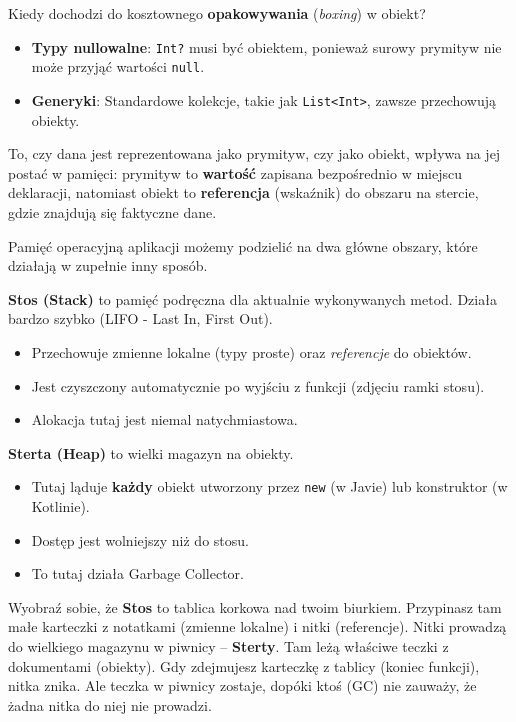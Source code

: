 Kiedy dochodzi do kosztownego \textbf{opakowywania} (\textit{boxing}) w obiekt?
\begin{itemize}
    \item \textbf{Typy nullowalne}: \texttt{Int?} musi być obiektem, ponieważ surowy prymityw nie może przyjąć wartości \texttt{null}.
    \item \textbf{Generyki}: Standardowe kolekcje, takie jak \texttt{List<Int>}, zawsze przechowują obiekty.
\end{itemize}

To, czy dana jest reprezentowana jako prymityw, czy jako obiekt, wpływa na jej postać w pamięci: prymityw to \textbf{wartość} zapisana bezpośrednio w miejscu deklaracji, natomiast obiekt to \textbf{referencja} (wskaźnik) do obszaru na stercie, gdzie znajdują się faktyczne dane.

Pamięć operacyjną aplikacji możemy podzielić na dwa główne obszary, które działają w zupełnie inny sposób.

\textbf{Stos (Stack)} to pamięć podręczna dla aktualnie wykonywanych metod. Działa bardzo szybko (LIFO - Last In, First Out).
\begin{itemize}
    \item Przechowuje zmienne lokalne (typy proste) oraz \textit{referencje} do obiektów.
    \item Jest czyszczony automatycznie po wyjściu z funkcji (zdjęciu ramki stosu).
    \item Alokacja tutaj jest niemal natychmiastowa.
\end{itemize}

\textbf{Sterta (Heap)} to wielki magazyn na obiekty.
\begin{itemize}
    \item Tutaj ląduje \textbf{każdy} obiekt utworzony przez \texttt{new} (w Javie) lub konstruktor (w Kotlinie).
    \item Dostęp jest wolniejszy niż do stosu.
    \item To tutaj działa Garbage Collector.
\end{itemize}

Wyobraź sobie, że \textbf{Stos} to tablica korkowa nad twoim biurkiem. Przypinasz tam małe karteczki z notatkami (zmienne lokalne) i nitki (referencje). Nitki prowadzą do wielkiego magazynu w piwnicy – \textbf{Sterty}. Tam leżą właściwe teczki z dokumentami (obiekty). Gdy zdejmujesz karteczkę z tablicy (koniec funkcji), nitka znika. Ale teczka w piwnicy zostaje, dopóki ktoś (GC) nie zauważy, że żadna nitka do niej nie prowadzi.

